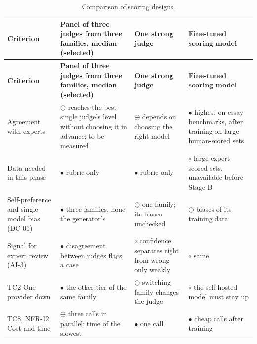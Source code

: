 {\small
\begin{longtable}{|>{\raggedright\arraybackslash}p{}|>{\raggedright\arraybackslash}p{}|>{\raggedright\arraybackslash}p{}|>{\raggedright\arraybackslash}p{}|}
\caption{Comparison of scoring designs.} \\
\hline
\textbf{Criterion} & \textbf{Panel of three judges from three families, median (selected)} & \textbf{One strong judge} & \textbf{Fine-tuned scoring model} \\ \hline
\endfirsthead
\hline
\textbf{Criterion} & \textbf{Panel of three judges from three families, median (selected)} & \textbf{One strong judge} & \textbf{Fine-tuned scoring model} \\ \hline
\endhead
Agreement with experts & $\ominus$ reaches the best single judge's level without choosing it in advance\cite{r123}; to be measured & $\ominus$ depends on choosing the right model & $\bullet$ highest on essay benchmarks\cite{r125}, after training on large human-\allowbreak{}scored sets \\ \hline
Data needed in this phase & $\bullet$ rubric only & $\bullet$ rubric only & $\circ$ large expert-\allowbreak{}scored sets, unavailable before Stage B \\ \hline
Self-\allowbreak{}preference and single-\allowbreak{}model bias (DC-01) & $\bullet$ three families, none the generator's\cite{r128} & $\ominus$ one family; its biases unchecked & $\ominus$ biases of its training data \\ \hline
Signal for expert review (AI-3) & $\bullet$ disagreement between judges flags a case & $\circ$ confidence separates right from wrong only weakly\cite{r117} & $\circ$ same \\ \hline
TC2 One provider down & $\bullet$ the other tier of the same family & $\ominus$ switching family changes the judge & $\circ$ the self-hosted model must stay up \\ \hline
TC8, NFR-02 Cost and time & $\ominus$ three calls in parallel; time of the slowest & $\bullet$ one call & $\bullet$ cheap calls after training \\ \hline
\end{longtable}
}


